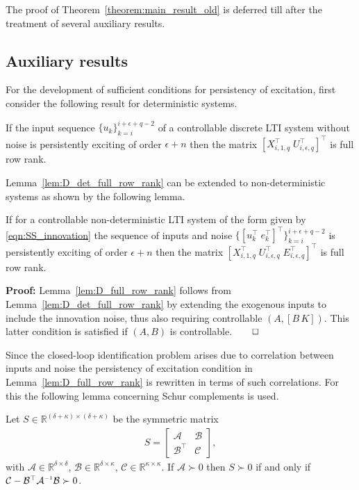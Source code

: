 The proof of Theorem~\ref{theorem:main_result_old} is deferred till after the treatment of several auxiliary results.
\subsection{Auxiliary results}\label{sec:aux_results}
For the development of sufficient conditions for persistency of excitation, first consider the following result for deterministic systems.
\begin{lem}\citep[Cor.~2(iii)]{Willems2005}\label{lem:D_det_full_row_rank}
    If the input sequence $\{u_k\}_{k=i}^{i+\epsilon+q-2}$ of a controllable discrete \ac{LTI} system without noise is persistently exciting of order $\epsilon+n$ then the matrix $\left[X_{i,1,q}^\top\;U_{i,\epsilon,q}^\top\right]^\top$ is full row rank.
\end{lem}
Lemma~\ref{lem:D_det_full_row_rank} can be extended to non-deterministic systems as shown by the following lemma.
\begin{lem}\label{lem:D_full_row_rank}
    If for a controllable non-deterministic \ac{LTI} system of the form given by \eqref{eqn:SS_innovation} the sequence of inputs and noise $\{[u_k^\top\;e_k^\top]^\top\}_{k=i}^{i+\epsilon+q-2}$ is persistently exciting of order $\epsilon+n$ then the matrix $\left[X_{i,1,q}^\top\;U_{i,\epsilon,q}^\top\;E_{i,\epsilon,q}^\top\right]^\top$ is full row rank.
\end{lem}
\textbf{Proof:} Lemma~\ref{lem:D_full_row_rank} follows from Lemma~\ref{lem:D_det_full_row_rank} by extending the exogenous inputs to include the innovation noise, thus also requiring controllable $(A,[B\,K])$. This latter condition is satisfied if $(A,B)$ is controllable.$\hfill\qed$

Since the closed-loop identification problem arises due to correlation between inputs and noise the persistency of excitation condition in Lemma~\ref{lem:D_full_row_rank} is rewritten in terms of such correlations. For this the following lemma concerning Schur complements is used.
\begin{lem}\citep[Lem.~2.7(i)]{Verhaegen2007a}\label{lem:Schur_comp}
    Let $S\in\mathbb{R}^{(\delta+\kappa)\times(\delta+\kappa)}$ be the symmetric matrix
    \begin{align*}
        S=\begin{bmatrix}
            \mathcal{A} & \mathcal{B}\\
            \mathcal{B}^\top & \mathcal{C}
        \end{bmatrix},
    \end{align*}
    with $\mathcal{A}\in\mathbb{R}^{\delta \times \delta}$, $\mathcal{B}\in\mathbb{R}^{\delta \times \kappa}$, $\mathcal{C}\in\mathbb{R}^{\kappa \times \kappa}$. If $\mathcal{A}\succ0$ then $S\succ0$ if and only if $\mathcal{C}-\mathcal{B}^\top\mathcal{A}\inv\mathcal{B}\succ0$.
\end{lem}

